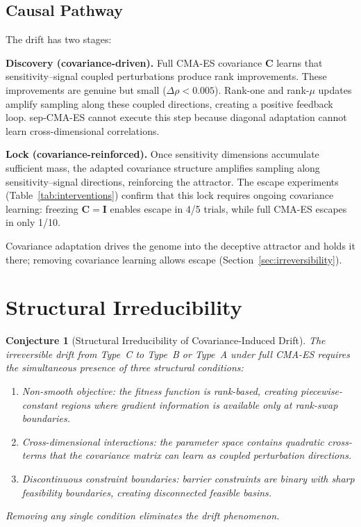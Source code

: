 \documentclass[twoside,11pt]{article}
\newcommand{\bC}{\mathbf{C}}
\newcommand{\bI}{\mathbf{I}}
\newtheorem{conjecture}{Conjecture}
\begin{document}
\subsection{Causal Pathway}

The drift has two stages:

\textbf{Discovery (covariance-driven).} Full CMA-ES covariance $\bC$ learns
that sensitivity--signal coupled perturbations produce rank improvements. These
improvements are genuine but small ($\Delta\rho < 0.005$). Rank-one and
rank-$\mu$ updates amplify sampling along these coupled directions, creating a
positive feedback loop. sep-CMA-ES cannot execute this step because diagonal
adaptation cannot learn cross-dimensional correlations.

\textbf{Lock (covariance-reinforced).} Once sensitivity dimensions accumulate
sufficient mass, the adapted covariance structure amplifies sampling along
sensitivity--signal directions, reinforcing the attractor. The escape
experiments (Table~\ref{tab:interventions}) confirm that this lock requires
ongoing covariance learning: freezing $\bC = \bI$ enables escape in 4/5
trials, while full CMA-ES escapes in only 1/10.

Covariance adaptation drives the genome into the deceptive attractor
and holds it there; removing covariance learning allows escape
(Section~\ref{sec:irreversibility}).

\section{Structural Irreducibility}
\label{sec:irreducibility}

\begin{conjecture}[Structural Irreducibility of Covariance-Induced Drift]
\label{conj:irreducibility}
The irreversible drift from Type~C to Type~B or Type~A under full CMA-ES
requires the simultaneous presence of three structural conditions:
\begin{enumerate}
\item[\emph{(C1)}] \emph{Non-smooth objective}: the fitness function is
  rank-based, creating piecewise-constant regions where gradient information
  is available only at rank-swap boundaries.
\item[\emph{(C2)}] \emph{Cross-dimensional interactions}: the parameter space
  contains quadratic cross-terms that the covariance matrix can learn as
  coupled perturbation directions.
\item[\emph{(C3)}] \emph{Discontinuous constraint boundaries}: barrier
  constraints are binary with sharp feasibility boundaries, creating
  disconnected feasible basins.
\end{enumerate}
Removing any single condition eliminates the drift phenomenon.
\end{conjecture}
\end{document}

